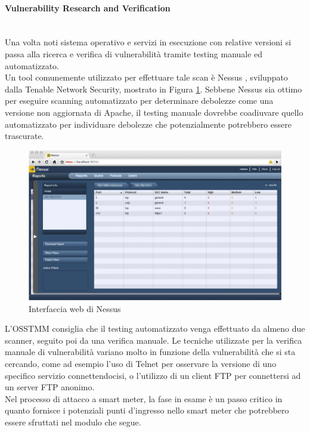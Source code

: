 \paragraph{Vulnerability Research and Verification}\mbox{}\\
Una volta noti sistema operativo e servizi in esecuzione con relative versioni si passa alla ricerca  e verifica di vulnerabilità tramite testing manuale ed automatizzato.\\
Un tool comunemente utilizzato per effettuare tale scan è Nessus \cite{nessus}, sviluppato dalla Tenable Network Security, mostrato in Figura \ref{nessus_img}. Sebbene Nessus sia ottimo per eseguire scanning automatizzato per determinare debolezze come una versione non aggiornata di Apache, il testing manuale dovrebbe coadiuvare quello automatizzato per individuare debolezze che potenzialmente potrebbero essere trascurate.\\
\begin{figure}[hbtp]
	\centering
	\includegraphics[scale=.3]{imgs/attack/nessus.png}
	\caption{Interfaccia web di Nessus}
	\label{nessus_img}
\end{figure}
L'OSSTMM consiglia che il testing automatizzato venga effettuato da almeno due scanner, seguito poi da una verifica manuale. Le tecniche utilizzate per la verifica manuale di vulnerabilità variano molto in funzione della vulnerabilità che si sta cercando, come ad esempio l'uso di Telnet per osservare la versione di uno specifico servizio connettendocisi, o l'utilizzo di un client FTP per connettersi ad un server FTP anonimo.\\
Nel processo di attacco a smart meter, la fase in esame è un passo critico in quanto fornisce i potenziali punti d'ingresso nello smart meter che potrebbero essere sfruttati nel modulo che segue.

